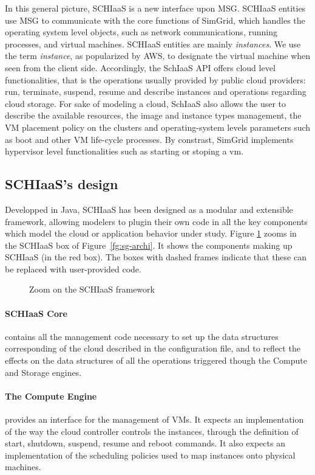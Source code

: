 In this general  picture, SCHIaaS is a new interface  upon MSG. SCHIaaS entities
use MSG  to communicate with  the core functions  of SimGrid, which  handles the
operating  system  level  objects,   such  as  network  communications,  running
processes, and  virtual machines. SCHIaaS entities  are mainly \emph{instances}.
We use the term \emph{instance}, as popularized by AWS, to designate the virtual
machine when  seen from  the client  side. Accordingly,  the SchIaaS  API offers
cloud level functionalities,  that is the operations usually  provided by public
cloud  providers: run,  terminate, suspend,  resume and  describe instances  and
operations regarding cloud  storage. For sake of modeling a  cloud, SchIaaS also
allows the  user to  describe the  available resources,  the image  and instance
types management, the  VM placement policy on the  clusters and operating-system
levels parameters such as boot and other VM life-cycle processes.  By constrast,
SimGrid implements hypervisor level functionalities  such as starting or stoping
a \ac{vm}.


\subsection{SCHIaaS's design}

Developped  in Java,  SCHIaaS  has been  designed as  a  modular and  extensible
framework, allowing modelers to plugin their  own code in all the key components
which model  the cloud  or application behavior  under study.   Figure \ref{fg:}
zooms in  the SCHIaaS box  of Figure~\ref{fg:sg-archi}. It shows  the components
making up SCHIaaS (in  the red box). The boxes with  dashed frames indicate that
these can be replaced with user-provided code.
%
\begin{figure}[hbt]
\centering
\resizebox{.6\textwidth}{!}{%

}
\caption{Zoom on the SCHIaaS framework}
\label{fg:}
\end{figure}
%
\paragraph{SCHIaaS Core} contains all the management code necessary to set up the data
  structures corresponding of the cloud described in the configuration file, and
  to reflect the effects on the  data structures of all the operations triggered
  though the Compute and Storage engines.

\paragraph{The  Compute Engine} provides  an interface for  the management of  VMs. It
  expects  an  implementation of  the  way  the  cloud controller  controls  the
  instances,  through the  definition of  start, shutdown,  suspend, resume  and
  reboot commands. It also expects  an implementation of the scheduling policies
  used to map instances onto physical machines.

